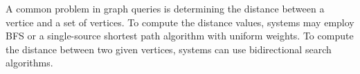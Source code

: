 
A common problem in graph queries is determining the distance between a vertice and
a set of vertices. To compute the distance values, systems may employ BFS or a
single-source shortest path algorithm with uniform weights. To compute the
distance between two given vertices, systems can use bidirectional search
algorithms.



